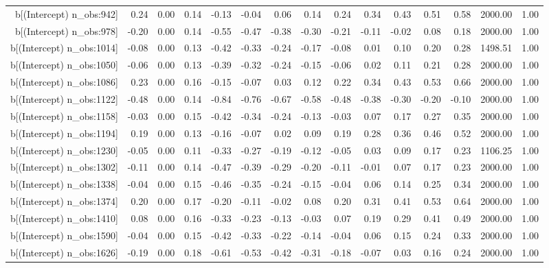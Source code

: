 \begin{table}[ht]
\begin{tabular}{rrrrrrrrrrrrrrr}
  b[(Intercept) n\_obs:942] & 0.24 & 0.00 & 0.14 & -0.13 & -0.04 & 0.06 & 0.14 & 0.24 & 0.34 & 0.43 & 0.51 & 0.58 & 2000.00 & 1.00 \\ 
  b[(Intercept) n\_obs:978] & -0.20 & 0.00 & 0.14 & -0.55 & -0.47 & -0.38 & -0.30 & -0.21 & -0.11 & -0.02 & 0.08 & 0.18 & 2000.00 & 1.00 \\ 
  b[(Intercept) n\_obs:1014] & -0.08 & 0.00 & 0.13 & -0.42 & -0.33 & -0.24 & -0.17 & -0.08 & 0.01 & 0.10 & 0.20 & 0.28 & 1498.51 & 1.00 \\ 
  b[(Intercept) n\_obs:1050] & -0.06 & 0.00 & 0.13 & -0.39 & -0.32 & -0.24 & -0.15 & -0.06 & 0.02 & 0.11 & 0.21 & 0.28 & 2000.00 & 1.00 \\ 
  b[(Intercept) n\_obs:1086] & 0.23 & 0.00 & 0.16 & -0.15 & -0.07 & 0.03 & 0.12 & 0.22 & 0.34 & 0.43 & 0.53 & 0.66 & 2000.00 & 1.00 \\ 
  b[(Intercept) n\_obs:1122] & -0.48 & 0.00 & 0.14 & -0.84 & -0.76 & -0.67 & -0.58 & -0.48 & -0.38 & -0.30 & -0.20 & -0.10 & 2000.00 & 1.00 \\ 
  b[(Intercept) n\_obs:1158] & -0.03 & 0.00 & 0.15 & -0.42 & -0.34 & -0.24 & -0.13 & -0.03 & 0.07 & 0.17 & 0.27 & 0.35 & 2000.00 & 1.00 \\ 
  b[(Intercept) n\_obs:1194] & 0.19 & 0.00 & 0.13 & -0.16 & -0.07 & 0.02 & 0.09 & 0.19 & 0.28 & 0.36 & 0.46 & 0.52 & 2000.00 & 1.00 \\ 
  b[(Intercept) n\_obs:1230] & -0.05 & 0.00 & 0.11 & -0.33 & -0.27 & -0.19 & -0.12 & -0.05 & 0.03 & 0.09 & 0.17 & 0.23 & 1106.25 & 1.00 \\ 
  b[(Intercept) n\_obs:1302] & -0.11 & 0.00 & 0.14 & -0.47 & -0.39 & -0.29 & -0.20 & -0.11 & -0.01 & 0.07 & 0.17 & 0.23 & 2000.00 & 1.00 \\ 
  b[(Intercept) n\_obs:1338] & -0.04 & 0.00 & 0.15 & -0.46 & -0.35 & -0.24 & -0.15 & -0.04 & 0.06 & 0.14 & 0.25 & 0.34 & 2000.00 & 1.00 \\ 
  b[(Intercept) n\_obs:1374] & 0.20 & 0.00 & 0.17 & -0.20 & -0.11 & -0.02 & 0.08 & 0.20 & 0.31 & 0.41 & 0.53 & 0.64 & 2000.00 & 1.00 \\ 
  b[(Intercept) n\_obs:1410] & 0.08 & 0.00 & 0.16 & -0.33 & -0.23 & -0.13 & -0.03 & 0.07 & 0.19 & 0.29 & 0.41 & 0.49 & 2000.00 & 1.00 \\ 
  b[(Intercept) n\_obs:1590] & -0.04 & 0.00 & 0.15 & -0.42 & -0.33 & -0.22 & -0.14 & -0.04 & 0.06 & 0.15 & 0.24 & 0.33 & 2000.00 & 1.00 \\ 
  b[(Intercept) n\_obs:1626] & -0.19 & 0.00 & 0.18 & -0.61 & -0.53 & -0.42 & -0.31 & -0.18 & -0.07 & 0.03 & 0.16 & 0.24 & 2000.00 & 1.00 \\ 

\end{tabular}
\end{table}
